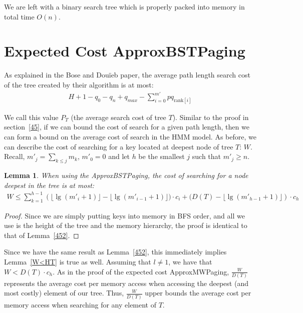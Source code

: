 \documentclass[letterpaper,12pt,titlepage,oneside,final]{book}
\theoremstyle{plain}
\newtheorem{lem}[thm]{Lemma}
\begin{document}
We are left with a binary search tree which is properly packed into memory in total time $O(n)$.


\section{Expected Cost ApproxBSTPaging}\label{48}

As explained in the Bose and Dou\"{i}eb paper, the average path length search cost of the tree created by their algorithm is at most: \cite{bose2009efficient}
\begin{align*}
H + 1 - q_0 - q_n + q_{max} - \sum_{i=0}^{m'} pq_{\text{rank}[i]}
\end{align*}

We call this value $P_T$ (the average search cost of tree $T$). Similar to the proof in section~\ref{45}, if we can bound the cost of search for a given path length, then we can form a bound on the average cost of search in the HMM model. As before, we can describe the cost of searching for a key located at deepest node of tree $T$: $W$. Recall, $m'_j = \sum_{k \leq j} m_k$, $m'_0 = 0$ and let $h$ be the smallest $j$ such that $m'_j \geq n$.

\begin{lem} 
When using the ApproxBSTPaging, the cost of searching for a node deepest in the tree is at most:
\begin{align*}
W \leq \sum_{k=1}^{h-1} \left(\lfloor \lg(m'_i+1) \rfloor - \lfloor \lg(m'_{i-1}+1) \rfloor)\cdot c_i+ (D(T) - \lfloor \lg(m'_{h-1}+1) \rfloor \right)\cdot c_h
\end{align*}
\end{lem}

\begin{proof}
Since we are simply putting keys into memory in BFS order, and all we use is the height of the tree and the memory hierarchy, the proof is identical to that of Lemma~\ref{452}.
\end{proof}

Since we have the same result as Lemma~\ref{452}, this immediately implies Lemma~\ref{W<HT} is true as well. Assuming that $l \neq 1$, we have that $W<D(T)\cdot c_h$. As in the proof of the expected cost ApproxMWPaging, $\frac{W}{D(T)}$ represents the average cost per memory access when accessing the deepest (and most costly) element of our tree. Thus, $\frac{W}{D(T)}$ upper bounds the average cost per memory access when searching for any element of $T$.
\\
\end{document}
